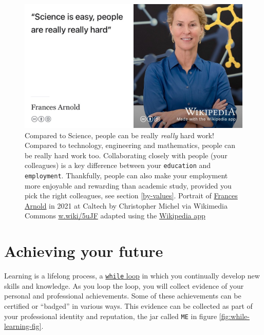 \documentclass[
]{book}
\begin{document}
\begin{figure}

{\centering \includegraphics[width=1\linewidth]{images/frances-arnold} 

}

\caption{Compared to Science, people can be really \emph{really} hard work! \citep{francesarnold} Compared to technology, engineering and mathematics, people can be really hard work too. Collaborating closely with people (your colleagues) is a key difference between your \texttt{education} and \texttt{employment}. Thankfully, people can also make your employment more enjoyable and rewarding than academic study, provided you pick the right colleagues, see section \ref{by-values}. Portrait of \href{https://en.wikipedia.org/wiki/Frances_Arnold}{Frances Arnold} in 2021 at Caltech by Christopher Michel via Wikimedia Commons \href{https://w.wiki/5uJF}{w.wiki/5uJF} adapted using the \href{https://apps.apple.com/gb/app/wikipedia/id324715238}{Wikipedia app}}\label{fig:frances-fig}
\end{figure}



\hypertarget{achieving}{%
\chapter{Achieving your future}\label{achieving}}

Learning is a lifelong process, a \href{https://en.wikipedia.org/wiki/While_loop}{\texttt{while} loop} in which you continually develop new skills and knowledge. As you loop the loop, you will collect evidence of your personal and professional achievements. Some of these achievements can be certified or ``badged'' in various ways. This evidence can be collected as part of your professional identity and reputation, the jar called \texttt{ME} in figure \ref{fig:while-learning-fig}.
\end{document}
